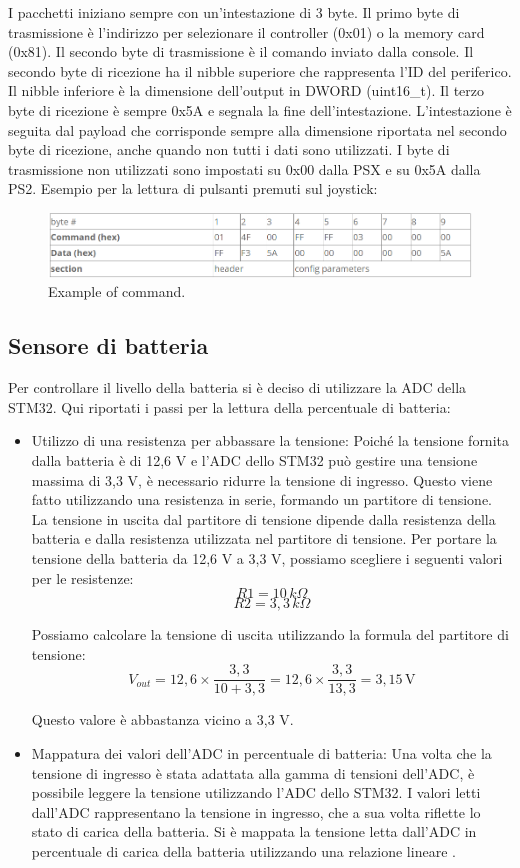 \documentclass{article}
\begin{document}
I pacchetti iniziano sempre con un'intestazione di 3 byte. Il primo byte di trasmissione è l'indirizzo per selezionare il controller (0x01) o la memory card (0x81). Il secondo byte di trasmissione è il comando inviato dalla console. Il secondo byte di ricezione ha il nibble superiore che rappresenta l'ID del periferico. Il nibble inferiore è la dimensione dell'output in DWORD (uint16\_t). Il terzo byte di ricezione è sempre 0x5A e segnala la fine dell'intestazione. L'intestazione è seguita dal payload che corrisponde sempre alla dimensione riportata nel secondo byte di ricezione, anche quando non tutti i dati sono utilizzati. I byte di trasmissione non utilizzati sono impostati su 0x00 dalla PSX e su 0x5A dalla PS2.
Esempio per la lettura di pulsanti premuti sul joystick:
\begin{figure}[H]
\centering
\includegraphics[width=0.9\linewidth]{image/example.png}
\caption{\label{example:pot}Example of command.}
\end{figure}
\subsection{Sensore di batteria}
Per controllare il livello della batteria si è deciso di utilizzare la ADC della STM32.
Qui riportati i passi per la lettura della percentuale di batteria:

\begin{itemize}
    \item Utilizzo di una resistenza per abbassare la tensione: Poiché la tensione fornita dalla batteria è di 12,6 V e l'ADC dello STM32 può gestire una tensione massima di 3,3 V, è necessario ridurre la tensione di ingresso. Questo viene fatto utilizzando una resistenza in serie, formando un partitore di tensione. La tensione in uscita dal partitore di tensione dipende dalla resistenza della batteria e dalla resistenza utilizzata nel partitore di tensione.
    Per portare la tensione della batteria da 12,6 V a 3,3 V, possiamo scegliere i seguenti valori per le resistenze:
\[ R1 = 10 \, k\Omega \]
\[ R2 = 3,3 \, k\Omega \]

Possiamo calcolare la tensione di uscita utilizzando la formula del partitore di tensione:
\[ V_{out} = 12,6 \times \frac{3,3}{10 + 3,3} = 12,6 \times \frac{3,3}{13,3} = 3,15 \, \text{V} \]

Questo valore è abbastanza vicino a 3,3 V.

    \item Mappatura dei valori dell'ADC in percentuale di batteria: Una volta che la tensione di ingresso è stata adattata alla gamma di tensioni dell'ADC, è possibile leggere la tensione utilizzando l'ADC dello STM32. I valori letti dall'ADC rappresentano la tensione in ingresso, che a sua volta riflette lo stato di carica della batteria. Si è mappata la tensione letta dall'ADC in percentuale di carica della batteria utilizzando una relazione lineare . 

\end{itemize}
\end{document}
